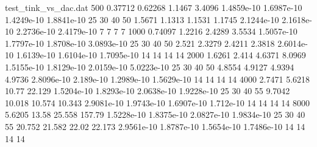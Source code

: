 \documentclass[a4paper,10pt]{article}
\begin{document}
\begin{filecontents}[overwrite]{test_tink_vs_dac.dat}
500     0.37712 0.62268 1.1467  3.4096  1.4859e-10      1.6987e-10      1.4249e-10      1.8841e-10      25      30      40      50      1.5671  1.1313  1.1531  1.1745  2.1244e-10      2.1618e-10    2.2736e-10      2.4179e-10      7       7       7       7  
1000    0.74097 1.2216  2.4289  3.5534  1.5057e-10      1.7797e-10      1.8708e-10      3.0893e-10      25      30      40      50      2.521   2.3279  2.4211  2.3818  2.6014e-10      1.6139e-10   1.6104e-10      1.7095e-10      14      14      14      14
2000    1.6261  2.414   4.6371  8.0969  1.5155e-10      1.8129e-10      2.0159e-10      5.0223e-10      25      30      40      50      4.8554  4.9127  4.9394  4.9736  2.8096e-10      2.189e-10    1.2989e-10      1.5629e-10      14      14      14      14   
4000    2.7471  5.6218  10.77   22.129  1.5204e-10      1.8293e-10      2.0638e-10      1.9228e-10      25      30      40      55      9.7042  10.018  10.574  10.343  2.9081e-10      1.9743e-10  1.6907e-10      1.712e-10       14      14      14      14    
8000    5.6205  13.58   25.558  157.79  1.5228e-10      1.8375e-10      2.0827e-10      1.9834e-10      25      30      40      55      20.752  21.582  22.02   22.173  2.9561e-10      1.8787e-10  1.5654e-10      1.7486e-10      14      14      14      14   
\end{filecontents}
\end{document}
